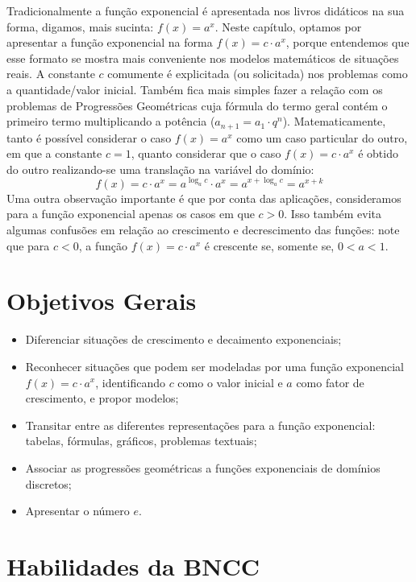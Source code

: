 \begin{apresentacao}
Tradicionalmente a função exponencial é apresentada nos livros didáticos na sua forma, digamos, mais sucinta: $f(x)=a^x$. Neste capítulo, optamos por apresentar a função exponencial na forma $f(x) = c \cdot a^x$, porque entendemos que esse formato se mostra mais conveniente nos modelos matemáticos de situações reais. A constante $c$ comumente é explicitada (ou solicitada) nos problemas como a quantidade/valor inicial. Também fica mais simples fazer a relação com os problemas de Progressões Geométricas cuja fórmula do termo geral contém o primeiro termo multiplicando a potência ($a_{n+1}=a_1\cdot q^n$). 
Matematicamente, tanto é possível considerar o caso $f(x)=a^x$ como um caso particular do outro, em que a constante $c=1$, quanto considerar que o caso $f(x)=c\cdot a^x$ é obtido do outro realizando-se uma translação na variável do domínio:
\[
f(x)=c\cdot a^x = a^{\log_a c} \cdot a^x = a^{x + \log_a c}=a^{x+k}
\]
Uma outra observação importante é que por conta das aplicações, consideramos para a função exponencial apenas os casos em que $c>0$. Isso também evita algumas confusões em relação ao crescimento e decrescimento das funções: note que para $c<0$, a função $f(x)=c\cdot a^x$ é crescente se, somente se, $0<a<1$.

\section*{Objetivos Gerais}

\begin{itemize}
\item {} Diferenciar situações de crescimento e decaimento exponenciais;

\item {} Reconhecer situações que podem ser modeladas por uma função exponencial $f(x)=c \cdot a^{x}$, identificando $c$ como o valor inicial e $a$ como fator de crescimento, e propor modelos;

\item {} Transitar entre as diferentes representações para a função exponencial: tabelas, fórmulas, gráficos, problemas textuais;

\item {} Associar as progressões geométricas a funções exponenciais de domínios discretos;

\item {} Apresentar o número $e$.
\end{itemize}

\section*{Habilidades da BNCC}


\end{apresentacao}
